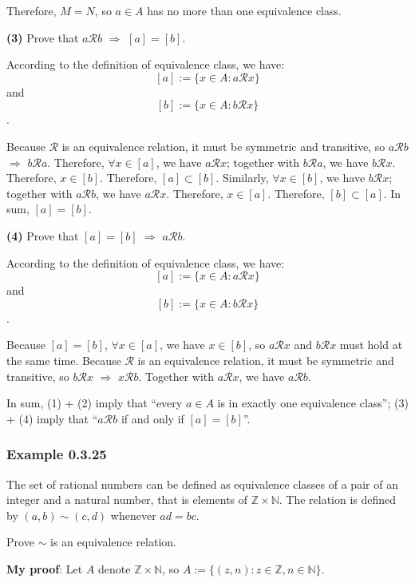 \documentclass[12pt, letterpaper, oneside]{book}
\begin{document}
Therefore, $M = N$, so $a \in A$ has no more than one equivalence class.

\textbf{(3)} Prove that $a \mathcal{R} b$ $\Rightarrow$ $[a] = [b]$.

According to the definition of equivalence class, we have: \[[a] := \{x \in A:
a \mathcal{R} x\}\] and \[[b] := \{x \in A: b \mathcal{R} x\}\].

Because $\mathcal{R}$ is an equivalence relation, it must be symmetric and
transitive, so $a \mathcal{R} b$ $\Rightarrow$ $b \mathcal{R} a$. Therefore,
$\forall x \in [a]$, we have $a \mathcal{R} x$; together with $b \mathcal{R} a$,
we have $b \mathcal{R} x$. Therefore, $x \in [b]$. Therefore, $[a] \subset [b]$.
Similarly, $\forall x \in [b]$, we have $b \mathcal{R} x$; together with $a
\mathcal{R} b$, we have $a \mathcal{R} x$. Therefore, $x \in [a]$. Therefore,
$[b] \subset [a]$. In sum, $[a] = [b]$.

\textbf{(4)} Prove that $[a] = [b]$ $\Rightarrow$ $a \mathcal{R} b$.

According to the definition of equivalence class, we have: \[[a] := \{x \in A:
a \mathcal{R} x\}\] and \[[b] := \{x \in A: b \mathcal{R} x\}\].

Because $[a] = [b]$, $\forall x \in [a]$, we have $x \in [b]$, so $a
\mathcal{R} x$ and $b \mathcal{R} x$ must hold at the same time. Because
$\mathcal{R}$ is an equivalence relation, it must be symmetric and transitive,
so $b \mathcal{R} x$ $\Rightarrow$ $x \mathcal{R} b$. Together with $a
\mathcal{R} x$, we have $a \mathcal{R} b$.

In sum, (1) + (2) imply that ``every $a \in A$ is in exactly one equivalence
class''; (3) + (4) imply that ``$a \mathcal{R} b$ if and only if $[a] = [b]$''.

\subsubsection{Example 0.3.25}

The set of rational numbers can be defined as equivalence classes of a pair of
an integer and a natural number, that is elements of $\mathbb{Z} \times
\mathbb{N}$. The relation is defined by $(a, b) \sim (c, d)$ whenever $ad = bc$.

Prove $\sim$ is an equivalence relation.

\colorbox{lime!100}{\textbf{My proof}}: Let $A$ denote $\mathbb{Z} \times
\mathbb{N}$, so $A := \{(z, n): z \in \mathbb{Z}, n \in \mathbb{N}\}$.
\end{document}

